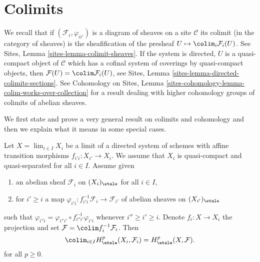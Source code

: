 \section{Colimits}
\label{section-colimit}

\noindent
We recall that if $(\mathcal{F}_i, \varphi_{ii'})$ is a diagram of sheaves on
a site $\mathcal{C}$ its colimit (in the category of sheaves) is the
sheafification of the presheaf $U \mapsto \colim_i \mathcal{F}_i(U)$. See
Sites, Lemma \ref{sites-lemma-colimit-sheaves}.
If the system is directed, $U$ is a quasi-compact object of
$\mathcal{C}$ which has a cofinal system of coverings by quasi-compact
objects, then $\mathcal{F}(U) = \colim \mathcal{F}_i(U)$, see
Sites, Lemma \ref{sites-lemma-directed-colimits-sections}.
See Cohomology on Sites, Lemma
\ref{sites-cohomology-lemma-colim-works-over-collection}
for a result dealing with higher cohomology groups of colimits
of abelian sheaves.

\medskip\noindent
We first state and prove a very general result on colimits and cohomology
and then we explain what it means in some special cases.

\begin{theorem}
\label{theorem-colimit}
Let $X = \lim_{i \in I} X_i$ be a limit of a directed system of schemes
with affine transition morphisms $f_{i'i} : X_{i'} \to X_i$. We assume
that $X_i$ is quasi-compact and quasi-separated for all $i \in I$.
Assume given
\begin{enumerate}
\item an abelian sheaf $\mathcal{F}_i$ on $(X_i)_\etale$ for all $i \in I$,
\item for $i' \geq i$ a map
$\varphi_{i'i} : f_{i'i}^{-1}\mathcal{F}_i \to \mathcal{F}_{i'}$
of abelian sheaves on $(X_{i'})_\etale$
\end{enumerate}
such that $\varphi_{i''i} = \varphi_{i''i'} \circ f_{i'' i'}^{-1}\varphi_{i'i}$
whenever $i'' \geq i' \geq i$.
Denote $f_i : X \to X_i$ the projection and set
$\mathcal{F} = \colim f_i^{-1}\mathcal{F}_i$. Then
$$
\colim_{i\in I} H_\etale^p(X_i, \mathcal{F}_i) = H_\etale^p(X, \mathcal{F}).
$$
for all $p \geq 0$.
\end{theorem}

